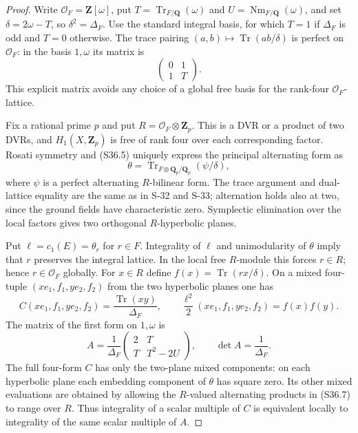 \documentclass[11pt,a4paper]{article}
\theoremstyle{definition}
\begin{document}
\begin{proof}
Write $\mathcal O_F=\mathbf Z[\omega]$, put
$T=\operatorname{Tr}_{F/\mathbf Q}(\omega)$ and
$U=\operatorname{Nm}_{F/\mathbf Q}(\omega)$, and set
$\delta=2\omega-T$, so $\delta^2=\Delta_F$.
Use the standard integral basis, for which $T=1$ if
$\Delta_F$ is odd and $T=0$ otherwise.
The trace pairing $(a,b)\mapsto\operatorname{Tr}(ab/\delta)$
is perfect on $\mathcal O_F$: in the basis $1,\omega$
its matrix is
\[
 \begin{pmatrix}0&1\\1&T\end{pmatrix}.
 \tag{S36.5}
\]
This explicit matrix avoids any choice of a global free
basis for the rank-four $\mathcal O_F$-lattice.

Fix a rational prime $p$ and put
$R=\mathcal O_F\otimes\mathbf Z_p$.
This is a DVR or a product of two DVRs, and
$H_1(X,\mathbf Z_p)$ is free of rank four over each
corresponding factor. Rosati symmetry and (S36.5)
uniquely express the principal alternating form as
\[
 \theta=\operatorname{Tr}_{F\otimes\mathbf Q_p/\mathbf Q_p}
                       (\psi/\delta),
 \tag{S36.6}
\]
where $\psi$ is a perfect alternating $R$-bilinear form.
The trace argument and dual-lattice equality are the
same as in S-32 and S-33; alternation holds also at two,
since the ground fields have characteristic zero.
Symplectic elimination over the local factors gives
two orthogonal $R$-hyperbolic planes.

Put $\ell=c_1(E)=\theta_r$ for $r\in F$.
Integrality of $\ell$ and unimodularity of $\theta$
imply that $r$ preserves the integral lattice. In the
local free $R$-module this forces $r\in R$; hence
$r\in\mathcal O_F$ globally.
For $x\in R$ define $f(x)=\operatorname{Tr}(rx/\delta)$.
On a mixed four-tuple $(xe_1,f_1,ye_2,f_2)$ from the
two hyperbolic planes one has
\[
 C(xe_1,f_1,ye_2,f_2)=\frac{\operatorname{Tr}(xy)}{\Delta_F},
 \qquad
 \frac{\ell^2}{2}(xe_1,f_1,ye_2,f_2)=f(x)f(y).
 \tag{S36.7}
\]
The matrix of the first form on $1,\omega$ is
\[
 A=\frac1{\Delta_F}
       \begin{pmatrix}2&T\\T&T^2-2U\end{pmatrix},
 \qquad \det A=\frac1{\Delta_F}.
 \tag{S36.8}
\]
The full four-form $C$ has only the two-plane mixed
components: on each hyperbolic plane each embedding
component of $\theta$ has square zero. Its other
mixed evaluations are obtained by allowing the
$R$-valued alternating products in (S36.7) to range
over $R$. Thus integrality of a scalar multiple of
$C$ is equivalent locally to integrality of the same
scalar multiple of $A$.


\end{proof}
\end{document}

